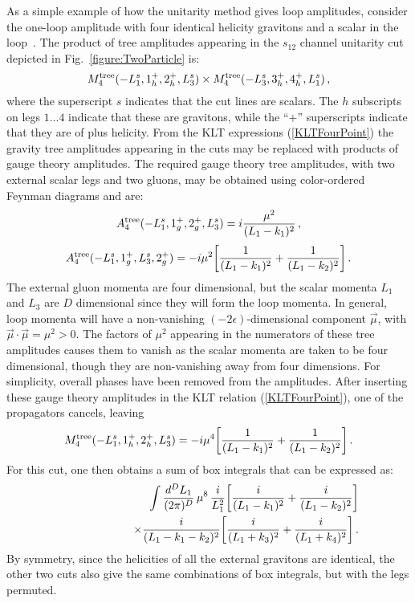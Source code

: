 \documentclass[12pt]{livrev}
\begin{document}
As a simple example of how the unitarity method gives loop amplitudes,
consider the one-loop amplitude with four identical helicity gravitons
and a scalar in the loop~\cite{AllPlusGrav,MHVGrav}. The product of
tree amplitudes appearing in the $s_{12}$ channel unitarity cut
depicted in Fig.~\ref{figure:TwoParticle} is:
%
\begin{equation}
 M_4^{\rm tree}(-L_1^s, 1^+_h, 2^+_h, L_3^s) \times 
M_4^{\rm tree}(-L_3^s, 3^+_h, 4^+_h, L_1^s) \,, 
\end{equation}
%
where the superscript $s$ indicates that the cut lines are scalars.
The $h$ subscripts on legs $1\ldots 4$ indicate that these are gravitons,
while the ``$+$'' superscripts indicate that they are of plus helicity.
{}From the KLT expressions (\ref{KLTFourPoint}) the gravity tree
amplitudes appearing in the cuts may be replaced with products of
gauge theory amplitudes.  The required gauge theory tree amplitudes,
with two external scalar legs and two gluons, may be obtained
using color-ordered Feynman diagrams and are:
%
\begin{equation}
A_4^{\rm tree}(-L_1^s,1^+_g,2^+_g,L_3^s) =  i
{\mu^2 \over ( L_1 -k_1)^2} \,,
\end{equation}
%
\begin{equation}
 A_4^{\rm tree}(-L_1^s, 1^+_g, L_3^s, 2^+_g) 
 = - i {\mu^2} 
 \biggl[{1\over (L_1 -k_1)^2 }
 + {1\over (L_1 -k_2)^2}\biggr] \,.
\end{equation}
%
The external gluon momenta are four dimensional, but the scalar
momenta $L_1$ and $L_3$ are $D$ dimensional since they will form the
loop momenta. In general, loop momenta will have a non-vanishing
$(-2\epsilon)$-dimensional component $\vec{\mu}$, with
$\vec{\mu}\cdot\vec{\mu} = \mu^2 > 0$.  The factors of $\mu^2$
appearing in the numerators of these tree amplitudes causes them to
vanish as the scalar momenta are taken to be four dimensional, though
they are non-vanishing away from four dimensions.  For simplicity,
overall phases have been removed from the amplitudes.  After inserting
these gauge theory amplitudes in the KLT relation
(\ref{KLTFourPoint}), one of the propagators cancels, leaving
%
\begin{equation}
 M_4^{\rm tree}(-L_1^s, 1^+_h, 2^+_h, L_3^s) = 
- i \mu^4 
 \biggl[{1\over (L_1 -k_1)^2}
 + {1\over (L_1 -k_2)^2}  \biggr] \,.
\end{equation}
%
For this cut, one then obtains a sum of box integrals that 
can be expressed as:
%
\begin{eqnarray}
&& \int {d^D L_1 \over (2 \pi)^D} \, \mu^8 \, {i \over L_1^2} 
 \biggl[{i \over (L_1 -k_1)^2}
 + {i \over (L_1 -k_2)^2}  \biggr] \nonumber \\
&& \hskip 2 cm \times {i \over (L_1 - k_1 - k_2)^2}
 \biggl[{i \over (L_1 + k_3)^2}
 + {i \over (L_1 + k_4)^2}  \biggr] \,.
\end{eqnarray}
%
By symmetry, since the helicities of all the external gravitons are
identical, the other two cuts also give the same combinations of
box integrals, but with the legs permuted.
\end{document}
